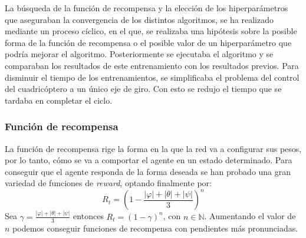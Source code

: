 La búsqueda de la función de recompensa y la elección de los hiperparámetros que aseguraban la convergencia de los distintos algoritmos, se ha realizado mediante un proceso cíclico, en el que, se realizaba una hipótesis sobre la posible forma de la función de recompensa o el posible valor de un hiperparámetro que podría mejorar el algoritmo. Posteriormente se ejecutaba el algoritmo y se comparaban los resultados de este entrenamiento con los resultados previos. Para disminuir el tiempo de los entrenamientos, se simplificaba el problema del control del cuadricóptero a un único eje de giro. Con esto se redujo el tiempo que se tardaba en completar el ciclo.


\subsubsection{Función de recompensa}
La función de recompensa rige la forma en la que la red va a configurar sus pesos, por lo tanto, cómo se va a comportar el agente en un estado determinado. Para conseguir que el agente responda de la forma deseada se han probado una gran variedad de funciones de \textit{reward}, optando finalmente por:
\begin{equation}
	R_t = \left( 1-\frac{|\varphi|  + |\theta| + |\psi|}{3}\right)^n
\end{equation}
Sea $\gamma= \frac{|\varphi|  + |\theta| + |\psi|}{3} $ entonces $R_t = (1- \gamma)^n$, con $n \in \mathbb{N}$. Aumentando el valor de $n$ podemos conseguir funciones de recompensa con pendientes más pronunciadas.

